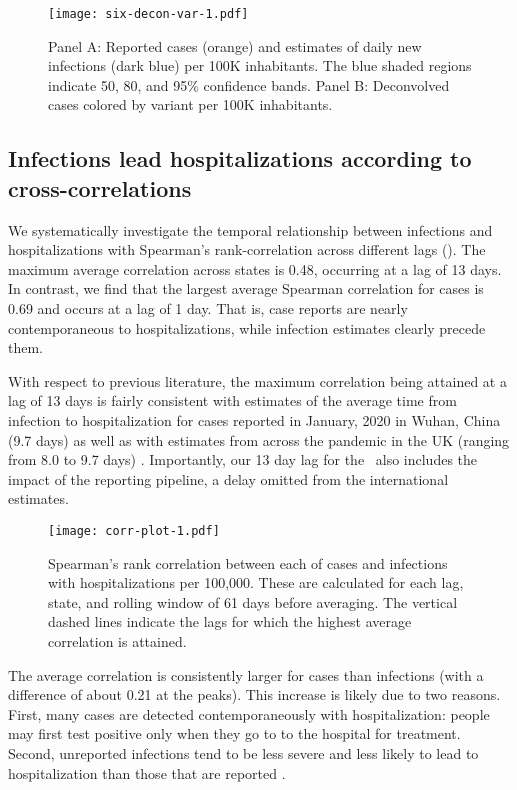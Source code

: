 \begin{figure}[!tb]
\centering
    \texttt{[image: six-decon-var-1.pdf]}
    \caption{Panel A: Reported cases (orange) and estimates of daily new
    infections (dark blue) per 100K inhabitants. The blue shaded regions
    indicate 50, 80, and 95\% confidence bands.  
    Panel B: Deconvolved cases colored by variant per 100K inhabitants.}
    \label{fig:six-states}
\end{figure}


\subsection{Infections lead hospitalizations according to cross-correlations}
\label{sec:lagged-correlations}

We systematically investigate the temporal relationship between infections and
hospitalizations with Spearman's rank-correlation across different lags
(). The maximum average correlation across states is
0.48, occurring at a lag of 13 days. In contrast, we find that the largest
average Spearman correlation for cases is 0.69 and occurs at a lag of 1 day.
That is, case reports are nearly contemporaneous to hospitalizations, while
infection estimates clearly precede them. 

With respect to previous literature, the maximum correlation being attained at a
lag of 13 days is fairly consistent with estimates of the average time from
infection to hospitalization for cases reported in January, 2020 in Wuhan, China
(9.7 days) as well as with estimates from across the pandemic in the UK (ranging
from 8.0 to 9.7 days) \citep{linton2020incubation, ward2021understanding}.
Importantly, our 13 day lag for the \US\ also includes the impact of the
reporting pipeline, a delay omitted from the international estimates. 

\begin{figure}[!tb]
\centering
\texttt{[image: corr-plot-1.pdf]} 
\caption{Spearman's rank correlation between each of cases and
infections with hospitalizations per 100,000. These are calculated for each lag,
state, and rolling window of 61 days before averaging. The vertical dashed lines
indicate the lags for which the highest average correlation is attained.}
\label{fig:correlations}
\end{figure}
    

The average correlation is consistently larger for cases than infections (with a
difference of about 0.21 at the peaks). This increase is likely due to two
reasons. First, many cases are detected contemporaneously with hospitalization:
people may first test positive only when they go to to the hospital for
treatment. Second, unreported infections tend to be less severe and less likely
to lead to hospitalization than those that are reported
\citep{sallahi2021using}.



